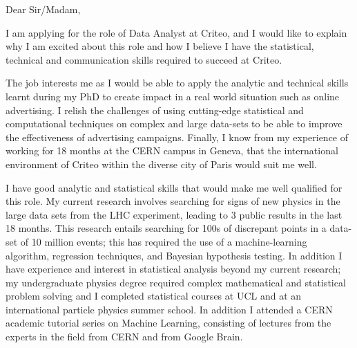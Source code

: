 \documentclass[]{letter}
\begin{document}

\begin{letter}{}  %
  \address{laurie.mcclymont@cern.ch\\
  +447951694231}
  \signature{Laurie McClymont}
  \opening{Dear Sir/Madam,}
  \vspace{1mm}

I am applying for the role of Data Analyst at Criteo, and I would like to explain why I am excited about this role and
how I believe I have the statistical, technical and communication skills required to succeed at Criteo.

The job interests me as I would be able to apply the analytic and technical skills learnt during my PhD
to create impact in a real world situation such as online advertising.
I relish the challenges of using cutting-edge statistical and computational techniques on complex and large data-sets to be able
to improve the effectiveness of advertising campaigns.
Finally, I know from my experience of working for 18 months at the CERN campus in Geneva,
that the international environment of Criteo within the diverse city of Paris would suit me well.

I have good analytic and statistical skills that would make me well qualified for this role.
My current research involves searching for signs of new physics in the large data sets from the LHC experiment,
leading to 3 public results in the last 18 months.
This research entails searching for 100s of discrepant points in a data-set of 10 million events;
this has required the use of a machine-learning algorithm, regression techniques, and  Bayesian hypothesis testing.
In addition I have experience and interest in statistical analysis beyond my current research;
my undergraduate physics degree required complex mathematical and statistical problem solving
and I completed statistical courses at UCL and at an international particle physics summer school.
In addition  I attended a CERN academic tutorial series on Machine Learning,
consisting of lectures from the experts in the field from CERN and from Google Brain.


\end{letter}
\end{document}

